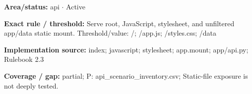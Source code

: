 \begin{tcolorbox}[enhanced,breakable,colback=white,colframe=Muted!45,boxrule=0.45pt,arc=1.5pt,left=6pt,right=6pt,top=5pt,bottom=5pt,title={\texttt{API-STATIC-10}},title after break={\texttt{API-STATIC-10}\ (continued)},fonttitle=\headingfont\bfseries\color{Navy},coltitle=Navy]
\textbf{Area/status:} api $\boldsymbol{\cdot}$ Active\par
\smallskip
\textbf{Exact rule / threshold:} Serve root, JavaScript, stylesheet, and unfiltered app/\allowbreak{}data static mount. Threshold/\allowbreak{}value: /\allowbreak{}; /\allowbreak{}app.js; /\allowbreak{}styles.css; /\allowbreak{}data\par
\smallskip
\textbf{Implementation source:} index; javascript; stylesheet; app.mount; app/\allowbreak{}api.py; Rulebook 2.3\par
\smallskip
\textbf{Coverage / gap:} partial; P: api\_\allowbreak{}scenario\_\allowbreak{}inventory.csv; Static-file exposure is not deeply tested.
\end{tcolorbox}
\medskip

